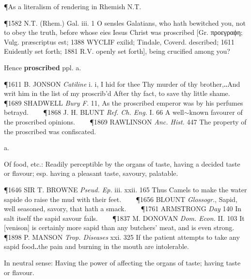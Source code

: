 \begin{description}[wide, labelwidth=!, labelindent=0pt]
\begin{myenumerate}
\noindent ¶As a literalism of rendering in Rhemish N.T.

\P 1582 N.T.  (Rhem.) Gal. iii. 1 O sensles Galatians, who hath bewitched you, not to obey the truth, before whose eies Iesus Christ was proscribed [Gr. προεγραϕη; Vulg. præscriptus est; 1388 WYCLIF  exilid; Tindale, Coverd. described; 1611 Euidently set forth; 1881 R.V.  openly set forth], being crucified among you?

\noindent Hence \textbf{proscribed} ppl. a.

\P 1611 B. JONSON  \textit{Catiline} i. i, I hid for thee Thy murder of thy brother,‥And writ him in the list of my proscrib'd After thy fact, to save thy little shame.    
\P 1689 SHADWELL  \textit{Bury F.} 11, As the proscribed emperor was by his perfumes betrayd.    
\P 1868 J. H. BLUNT  \textit{Ref. Ch. Eng.} I. 66 A well$\sim$known favourer of the proscribed opinions.    
\P 1869 RAWLINSON  \textit{Anc. Hist.} 447 The property of the proscribed was confiscated.



\end{myenumerate}


 a.

\noindent {}

\vspace{-0.3cm}

\begin{myenumerate}

 Of food, etc.: Readily perceptible by the organs of taste, having a decided taste or flavour; esp. having a pleasant taste, savoury, palatable.

\P 1646 SIR T. BROWNE  \textit{Pseud. Ep.} iii. xxii. 165 Thus Camels to make the water sapide do raise the mud with their feet.    
\P 1656 BLOUNT  \textit{Glossogr.}, Sapid, well seasoned, savory, that hath a smack.    
\P 1761 ARMSTRONG  \textit{Day} 140 In salt itself the sapid savour fails.    
\P 1837 M. DONOVAN  \textit{Dom. Econ.} II. 103 It [venison] is certainly more sapid than any butchers' meat, and is even strong.    
\P 1898 P. MANSON  \textit{Trop. Diseases} xxi. 325 If the patient attempts to take any sapid food‥the pain and burning in the mouth are intolerable.

 In neutral sense: Having the power of affecting the organs of taste; having taste or flavour.


\end{myenumerate}
\end{description}
